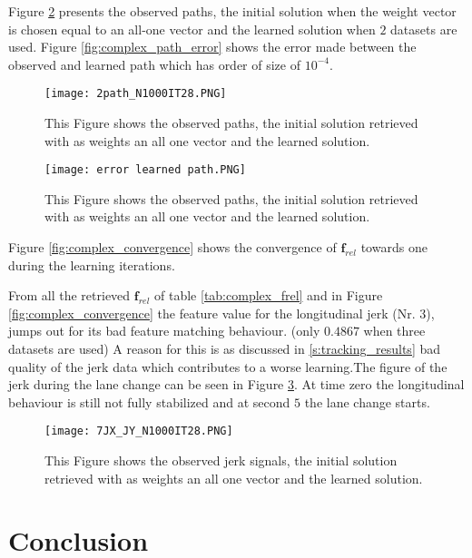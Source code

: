 Figure \ref{fig:complex_path} presents the observed paths, the initial solution when the weight vector is chosen equal to an all-one vector and the learned solution when $2$ datasets are used. Figure \ref{fig:complex_path_error} shows the error made between the observed and learned path which has order of size of $10^{-4}$.

\begin{figure}[h!]
	\centering
	\texttt{[image: 2path\_N1000IT28.PNG]}
	\caption{This Figure shows the observed paths, the initial solution retrieved with as weights an all one vector and the learned solution.}	
	\label{fig:complex_path}
\end{figure}

\begin{figure}[h!]
	\centering
	\texttt{[image: error learned path.PNG]}
	\caption{This Figure shows the observed paths, the initial solution retrieved with as weights an all one vector and the learned solution.}	
	\label{fig:complex_path}
\end{figure}

Figure \ref{fig:complex_convergence} shows the convergence of $\bm{f}_{rel}$ towards one during the learning iterations. 



From all the retrieved $\bm{f}_{rel}$ of table \ref{tab:complex_frel} and in Figure \ref{fig:complex_convergence} the feature value for the longitudinal jerk (Nr. $3$), jumps out for its bad feature matching behaviour. (only $0.4867$ when three datasets are used) A reason for this is as discussed in \ref{s:tracking_results} bad quality of the jerk data which contributes to a worse learning.The figure of the jerk during the lane change can be seen in Figure \ref{fig:complex_jerk}. At time zero the longitudinal behaviour is still not fully stabilized and at second $5$ the lane change starts.

\begin{figure}[h!]
	\centering
	\texttt{[image: 7JX\_JY\_N1000IT28.PNG]}
	\caption{This Figure shows the observed jerk signals, the initial solution retrieved with as weights an all one vector and the learned solution.}	
	\label{fig:complex_jerk}
\end{figure}
                                    
                    











\section{Conclusion}

